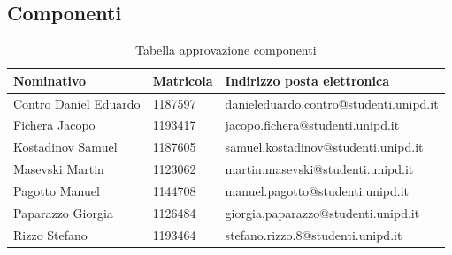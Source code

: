 \documentclass[../piano_di_progetto.tex]{subfiles}
\begin{document}
\subsection{Componenti}%
\label{sub:comp}

\begin{table}[!ht]
	\centering
	\begin{tabular}{|l|l|l|}
		\hline
		\rowcolor{lightgray}
		\textbf{Nominativo} & \textbf{Matricola} & \textbf{Indirizzo posta elettronica} \\ 
		\hline
		Contro Daniel Eduardo & 1187597 & danieleduardo.contro@studenti.unipd.it \\ 
		\hline
		Fichera Jacopo & 1193417  & jacopo.fichera@studenti.unipd.it \\ 
		\hline
		Kostadinov Samuel & 1187605 & samuel.kostadinov@studenti.unipd.it \\ 
		\hline
		Masevski Martin & 1123062 & martin.masevski@studenti.unipd.it \\ 
		\hline
		Pagotto Manuel & 1144708 & manuel.pagotto@studenti.unipd.it \\ 
		\hline
		Paparazzo Giorgia & 1126484 & giorgia.paparazzo@studenti.unipd.it \\ 
		\hline
		Rizzo Stefano & 1193464 & stefano.rizzo.8@studenti.unipd.it \\ 
		\hline
	\end{tabular}
		\caption{Tabella approvazione componenti}
\end{table}
\end{document}
